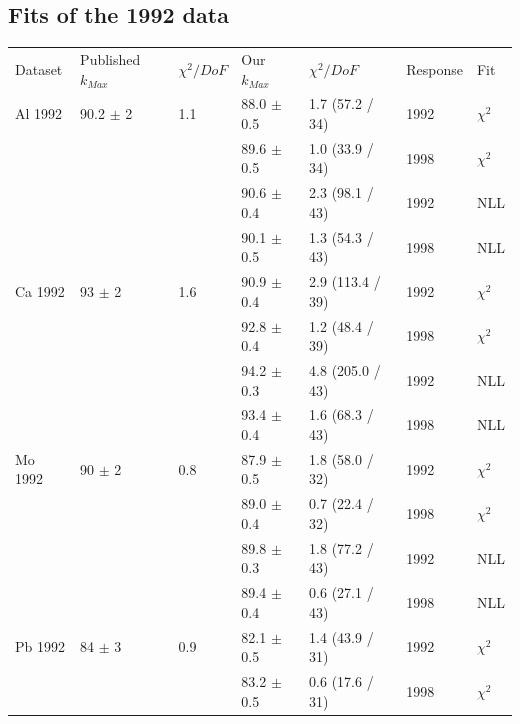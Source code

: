 \subsection { Fits of the 1992 data }
\begin{table}[H]
  \begin{center}
    \begin{tabular}{|l||l|l|l|l|l|l|}
      \hline
      Dataset & Published $k_{Max}$ & $\chi^2 / DoF$ & Our $k_{Max}$ & $\chi^2 / DoF$  & Response & Fit \\
      \hhline{|=||=|=|=|=|=|=|}
       Al 1992   & 90.2 $\pm$ 2   & 1.1 & 88.0 $\pm$ 0.5 & 1.7 (57.2 / 34) & 1992 & $\chi^2$ \\  
                 &                &     & 89.6 $\pm$ 0.5 & 1.0 (33.9 / 34) & 1998 & $\chi^2$ \\  
                                                                            
                 &                &     & 90.6 $\pm$ 0.4 & 2.3 (98.1 / 43) & 1992 & NLL \\
                 &                &     & 90.1 $\pm$ 0.5 & 1.3 (54.3 / 43) & 1998 & NLL \\
       \hline                                                               
       Ca 1992   & 93   $\pm$ 2   & 1.6 & 90.9 $\pm$ 0.4 & 2.9 (113.4 / 39)& 1992 & $\chi^2$ \\  
                 &                &     & 92.8 $\pm$ 0.4 & 1.2 (48.4 / 39) & 1998 & $\chi^2$ \\  
                                                                            
                 &                &     & 94.2 $\pm$ 0.3 & 4.8 (205.0 / 43)& 1992 & NLL \\
                 &                &     & 93.4 $\pm$ 0.4 & 1.6 (68.3 / 43) & 1998 & NLL \\
      \hline                                                                
       Mo 1992   & 90   $\pm$ 2   & 0.8 & 87.9 $\pm$ 0.5 & 1.8 (58.0 / 32) & 1992 & $\chi^2$ \\  
                 &                &     & 89.0 $\pm$ 0.4 & 0.7 (22.4 / 32) & 1998 & $\chi^2$ \\  
                                                                            
                 &                &     & 89.8 $\pm$ 0.3 & 1.8 (77.2 / 43) & 1992 & NLL \\
                 &                &     & 89.4 $\pm$ 0.4 & 0.6 (27.1 / 43) & 1998 & NLL \\
      \hline                                                                
       Pb 1992   & 84   $\pm$ 3   & 0.9 & 82.1 $\pm$ 0.5 & 1.4 (43.9 / 31) & 1992 & $\chi^2$ \\  
                 &                &     & 83.2 $\pm$ 0.5 & 0.6 (17.6 / 31) & 1998 & $\chi^2$ \\  
                                                                            

\end{tabular}
\end{center}
\end{table}
